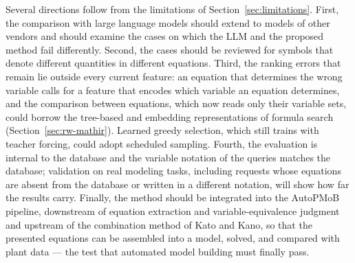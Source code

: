 Several directions follow from the limitations of Section~\ref{sec:limitations}. First, the
comparison with large language models should extend to models of other vendors and should examine
the cases on which the LLM and the proposed method fail differently. Second, the cases should be
reviewed for symbols that denote different quantities in different equations. Third,
the ranking errors that remain lie outside every current feature: an equation that determines the
wrong variable calls for a feature that encodes which variable an equation determines, and the
comparison between equations, which now reads only their variable sets, could borrow the tree-based
and embedding representations of formula search (Section~\ref{sec:rw-mathir}). Learned greedy
selection, which still trains with teacher forcing, could adopt scheduled sampling. Fourth, the
evaluation is internal to the database and the variable notation of the queries matches the
database; validation on real modeling tasks, including requests whose equations are absent from the
database or written in a different notation, will show how far the results carry. Finally, the
method should be integrated into the AutoPMoB pipeline, downstream of equation extraction and
variable-equivalence judgment and upstream of the combination method of Kato and
Kano\cite{CombineEq}, so that the presented equations can be assembled into a model, solved, and
compared with plant data --- the test that automated model building must finally pass.
